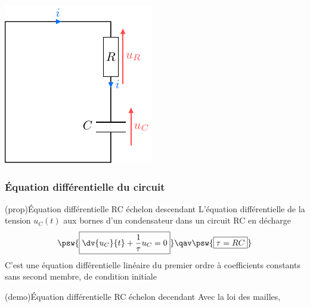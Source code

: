 \documentclass[../../main/main.tex]{subfiles}
\begin{document}
\begin{tcb*}[sidebyside, righthand ratio=.30]
\begin{center}
{      \includegraphics[width=.9\linewidth]{circ_rc-decharge}
    }%
    \label{fig:circ_rc-decharge}
  \end{center}
\end{tcb*}

\subsubsection{Équation différentielle du circuit}
	\begin{tcb*}[label=prop:eqdiffrc, sidebyside,
  list entry={\lte\theprop~:~Équa. diff. RC descendant}]
  (prop){Équation différentielle RC échelon descendant}
		L'équation différentielle de la tension $u_C(t)$ aux bornes d'un
		condensateur dans un circuit RC en décharge
			\[
		\psw{%
        \boxed{\dv{u_C}{t} + \frac{1}{\tau}u_C = 0}
		}%
    \qav
    \psw{%
      \boxed{\tau = RC}
    }%
      \]
		\tcblower
		C'est une équation différentielle linéaire du premier ordre à
		coefficients constants sans second membre, de condition initiale
		\psw{%
			\[ \boxed{u_C(0^-) = u_C(0^+) = E}\]
		}%
	\end{tcb*}
	\begin{tcb*}[label=demo:eqdiffrc,
  list entry={\lte\thedemo~:~Équa. diff. RC descendant}]
  (demo){Équation différentielle RC échelon decendant}
		Avec la loi des mailles,
    \vspace{-25pt}
	\end{tcb*}
\end{document}
